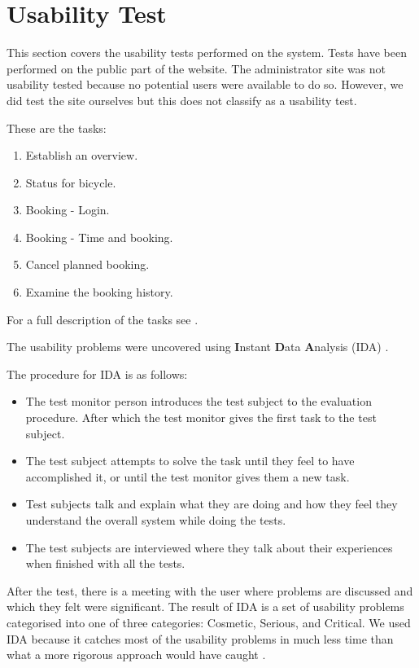 \section{Usability Test}
This section covers the usability tests performed on the system.
Tests have been performed on the public part of the website.
The administrator site was not usability tested because no potential users were available to do so.
However, we did test the site ourselves but this does not classify as a usability test.

These are the tasks:

\begin{enumerate}
\item Establish an overview.
\item Status for bicycle.
\item Booking - Login.
\item Booking - Time and booking.
\item Cancel planned booking.
\item Examine the booking history.
\end{enumerate}
For a full description of the tasks see .

The usability problems were uncovered using \textbf{I}nstant \textbf{D}ata \textbf{A}nalysis (IDA) \citep{misc:usabilitytest}.

The procedure for IDA is as follows:

\begin{itemize}
\item The test monitor person introduces the test subject to the evaluation procedure. After which the test monitor gives the first task to the test subject.
\item The test subject attempts to solve the task until they feel to have accomplished it, or until the test monitor gives them a new task.
\item Test subjects talk and explain what they are doing and how they feel they understand the overall system while doing the tests.
\item The test subjects are interviewed where they talk about their experiences when finished with all the tests.
\end{itemize}

After the test, there is a meeting with the user where problems are discussed and which they felt were significant.
The result of IDA is a set of usability problems categorised into one of three categories: Cosmetic, Serious, and Critical.
We used IDA because it catches most of the usability problems in much less time than what a more rigorous approach would have caught \citep{misc:usabilitytest}.

